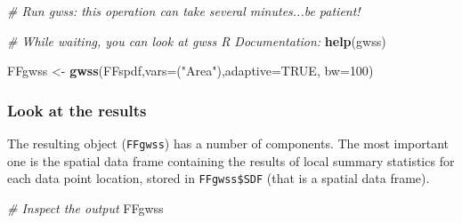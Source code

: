\documentclass[
]{article}
\newenvironment{Shaded}{\begin{snugshade}}{\end{snugshade}}
\newcommand{\AttributeTok}[1]{\textcolor[rgb]{0.13,0.29,0.53}{#1}}
\newcommand{\CommentTok}[1]{\textcolor[rgb]{0.56,0.35,0.01}{\textit{#1}}}
\newcommand{\ConstantTok}[1]{\textcolor[rgb]{0.56,0.35,0.01}{#1}}
\newcommand{\DecValTok}[1]{\textcolor[rgb]{0.00,0.00,0.81}{#1}}
\newcommand{\FunctionTok}[1]{\textcolor[rgb]{0.13,0.29,0.53}{\textbf{#1}}}
\newcommand{\NormalTok}[1]{#1}
\newcommand{\OtherTok}[1]{\textcolor[rgb]{0.56,0.35,0.01}{#1}}
\newcommand{\StringTok}[1]{\textcolor[rgb]{0.31,0.60,0.02}{#1}}
\begin{document}
\begin{Shaded}
\begin{Highlighting}[]
\CommentTok{\# Run gwss: this operation can take several minutes...be patient!}

\CommentTok{\# While waiting, you can look at gwss R Documentation:}
\FunctionTok{help}\NormalTok{(gwss)}

\NormalTok{FFgwss }\OtherTok{\textless{}{-}} \FunctionTok{gwss}\NormalTok{(FFspdf,}\AttributeTok{vars=}\NormalTok{(}\StringTok{"Area"}\NormalTok{),}\AttributeTok{adaptive=}\ConstantTok{TRUE}\NormalTok{, }\AttributeTok{bw=}\DecValTok{100}\NormalTok{)}
\end{Highlighting}
\end{Shaded}

\subsubsection{Look at the results}\label{look-at-the-results}

The resulting object (\texttt{FFgwss}) has a number of components. The most important one is the spatial data frame containing the results of local summary statistics for each data point location, stored in \texttt{FFgwss\$SDF} (that is a spatial data frame).

\begin{Shaded}
\begin{Highlighting}[]
\CommentTok{\# Inspect the output }
\NormalTok{FFgwss}
\end{Highlighting}
\end{Shaded}
\end{document}
